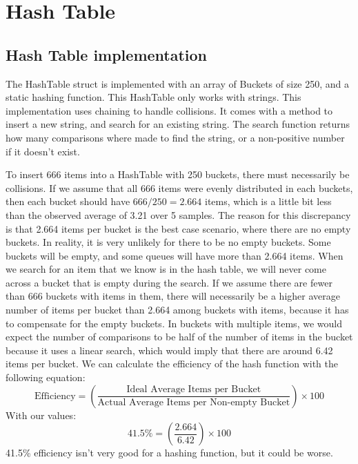 \documentclass[letterpaper, 10pt,DIV=13]{scrartcl}
\numberwithin{equation}{section} %
\numberwithin{figure}{section} %
\numberwithin{table}{section} %
\begin{document}
\section{Hash Table}
\subsection{Hash Table implementation}

The HashTable struct is implemented with an array of Buckets of size 250, and a static hashing function.
This HashTable only works with strings. This implementation uses chaining to handle collisions.
It comes with a method to insert a new string, and search for an existing string. The search function returns
how many comparisons where made to find the string, or a non-positive number if it doesn't exist.

To insert 666 items into a HashTable with 250 buckets, there must necessarily be collisions. If we assume that
all 666 items were evenly distributed in each buckets, then each bucket should have $666/250=2.664$ items, which is
a little bit less than the observed average of 3.21 over 5 samples. The reason for this discrepancy is that 2.664
items per bucket is the best case scenario, where there are no empty buckets. In reality, it is very unlikely for
there to be no empty buckets. Some buckets will be empty, and some queues will have more than 2.664 items. When we
search for an item that we know is in the hash table, we will never come across a bucket that is empty during the
search. If we assume there are fewer than 666 buckets with items in them, there will necessarily be a higher
average number of items per bucket than 2.664 among buckets with items, because it has to compensate for the empty
buckets. In buckets with multiple items, we would expect the number of comparisons to be half of the number
of items in the bucket because it uses a linear search, which would imply that there are around 6.42 items
per bucket. We can calculate the efficiency of the hash function with the following equation:
\begin{equation}
\text{Efficiency} = \left( \frac{\text{Ideal Average Items per Bucket}}{\text{Actual Average Items per Non-empty Bucket}} \right) \times 100
\end{equation}
With our values:
\begin{equation}
\text{41.5\%} = \left( \frac{\text{2.664}}{\text{6.42}} \right) \times 100
\end{equation}
41.5\% efficiency isn't very good for a hashing function, but it could be worse.
\end{document}
